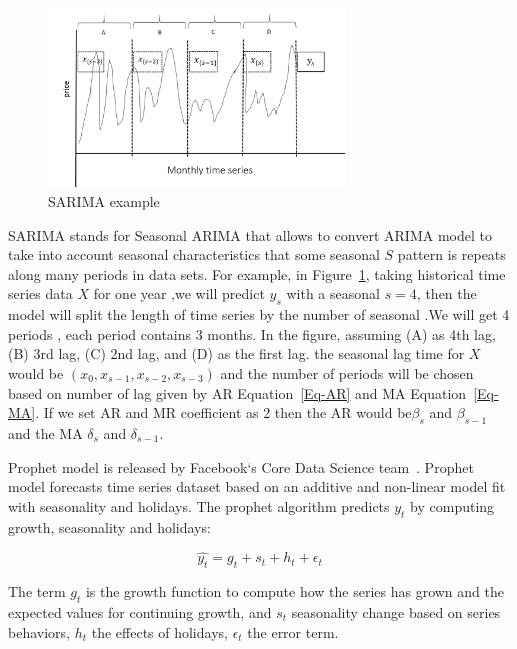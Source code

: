 \documentclass[graybox]{svmult}
\begin{document}
\begin{figure}
\centering\includegraphics[width=0.7\textwidth]{figures/SARIMA.png}\caption{SARIMA example}\label{fig:sarima}
\end{figure}

SARIMA stands for Seasonal ARIMA that allows to convert ARIMA model to take into account seasonal characteristics that some seasonal \(S\) pattern is repeats along many periods in data sets. For example, in Figure~\ref{fig:sarima}, taking historical time series data \(X\) for one year ,we will predict \(y_s\) with a seasonal \(s= 4\), then the model will split the length of time series by the number of seasonal .We will get 4 periods , each period contains 3 months. In the figure, assuming (A) as 4th lag, (B) 3rd lag, (C) 2nd lag, and (D) as the first lag. the seasonal lag time for \(X\) would be \((x_{0}, x_{{s-1}}, x_{{s-2}}, x_{{s-3}} )\) and the number of periods will be chosen based on number of lag given by AR Equation~\ref{Eq-AR} and MA Equation~\ref{Eq-MA}. If we set AR and MR coefficient as 2 then the AR would be\(\beta_{s}\) and \(\beta_{s-1}\) and the MA \(\delta_{s}\) and \(\delta_{s-1}\).

Prophet model is released by Facebook`s Core Data Science team~\cite{prophet}. Prophet model forecasts time series dataset based on an additive and non-linear model fit with seasonality and holidays. The prophet algorithm predicts \(y_t\) by computing growth, seasonality and holidays:

\begin{equation}
\hat{y_t} = g_t + s_t +h_t+\epsilon_t
\label{Eq-prophet}
\end{equation}

The term \(g_t\) is the growth function to compute how the series has grown and the expected values for continuing growth, and \(s_t\) seasonality change based on series behaviors, \(h_t\) the effects of holidays, \(\epsilon_t\) the error term.
\end{document}
